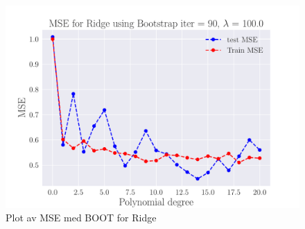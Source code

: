 \documentclass[reprint,english,notitlepage,aps,nobalancelastpage,nofootinbib]{revtex4-1}  %
\begin{document}
\begin{figure}[H]
	\endminipage\hfill
	\includegraphics[width=\linewidth]{MSE_Ridge_n30_eps02_pol20_Bootstrap_re90_lam_100_0.pdf}
	\endminipage
	\caption{Plot av MSE med BOOT for Ridge} \label{fig:Ridge_overfitting}
\end{figure}
\end{document}
